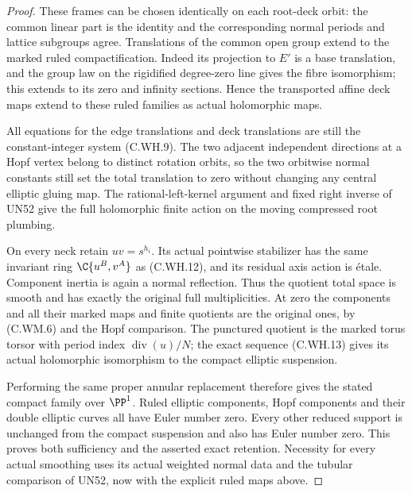 \begin{proof}
These frames can be chosen identically
on each root-deck orbit: the common
linear part is the identity and
the corresponding normal periods
and lattice subgroups agree.
Translations of the common open
group extend to the marked ruled
compactification. Indeed its
projection to $E'$ is a base
translation, and the group law on
the rigidified degree-zero line
gives the fibre isomorphism;
this extends to its zero and
infinity sections. Hence the
transported affine deck maps
extend to these ruled families
as actual holomorphic maps.

All equations for the edge
translations and deck translations
are still the constant-integer
system (C.WH.9).
The two adjacent independent
directions at a Hopf vertex belong
to distinct rotation orbits, so
the two orbitwise normal constants
still set the total translation
to zero without changing any
central elliptic gluing map.
The rational-left-kernel argument
and fixed right inverse of UN52
give the full holomorphic finite
action on the moving compressed
root plumbing.

On every neck retain $uv=s^{h_i}$.
Its actual pointwise stabilizer
has the same invariant ring
$\C\{u^B,v^A\}$ as (C.WH.12),
and its residual axis action is
\'{e}tale. Component inertia is
again a normal reflection.
Thus the quotient total space is
smooth and has exactly the
original full multiplicities.
At zero the components and all
their marked maps and finite
quotients are the original ones,
by (C.WM.6) and the Hopf comparison.
The punctured quotient is the
marked torus torsor with period
index $\operatorname{div}(u)/N$;
the exact sequence (C.WH.13)
gives its actual holomorphic
isomorphism to the compact
elliptic suspension.

Performing the same proper
annular replacement therefore
gives the stated compact family
over $\PP^1$. Ruled elliptic
components, Hopf components and
their double elliptic curves all
have Euler number zero. Every
other reduced support is unchanged
from the compact suspension and
also has Euler number zero.
This proves both sufficiency and
the asserted exact retention.
Necessity for every actual
smoothing uses its actual weighted
normal data and the tubular
comparison of UN52, now with
the explicit ruled maps above.
\end{proof}

